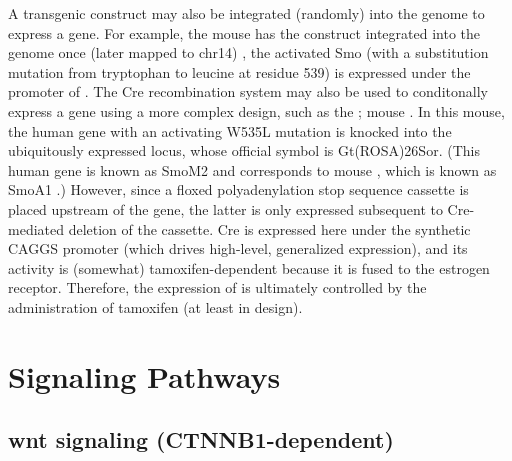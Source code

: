 A transgenic construct may also be integrated (randomly) into the genome to express a gene. For example, the  mouse has the  construct integrated into the genome once (later mapped to chr14) , the activated Smo (with a substitution mutation from tryptophan to leucine at residue 539) is expressed under the promoter of . The Cre recombination system may also be used to conditonally express a gene using a more complex design, such as the ; mouse . In this mouse, the human  gene with an activating W535L mutation is knocked into the ubiquitously expressed  locus, whose official symbol is Gt(ROSA)26Sor. (This human  gene is known as SmoM2  and corresponds to mouse , which is known as SmoA1 .) However, since a floxed polyadenylation stop sequence cassette is placed upstream of the  gene, the latter is only expressed subsequent to Cre-mediated deletion of the cassette. Cre is expressed here under the synthetic CAGGS promoter (which drives high-level, generalized expression), and its activity is (somewhat) tamoxifen-dependent because it is fused to the estrogen receptor. Therefore, the expression of  is ultimately controlled by the administration of tamoxifen (at least in design).


\section{Signaling Pathways}
\label{sec:signal-pathways}

\subsection{\gls{wnt} signaling (CTNNB1-dependent)}

